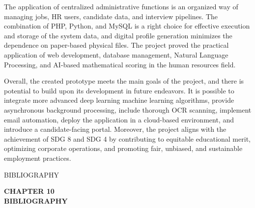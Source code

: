 \documentclass[12pt,a4paper]{report}
\begin{document}
The application of centralized administrative functions is an organized
way of managing jobs, HR users, candidate data, and interview pipelines.
The combination of PHP, Python, and MySQL is a right choice for effective
execution and storage of the system data, and digital profile generation
minimizes the dependence on paper-based physical files. The project proved the
practical application of web development, database management, Natural Language Processing,
and AI-based mathematical scoring in the human resources field.

Overall, the created prototype meets the main goals of the project, and there is
potential to build upon its development in future endeavors. It is possible
to integrate more advanced deep learning machine learning algorithms, provide asynchronous background processing, include thorough OCR scanning, implement email automation, deploy the application in a cloud-based
environment, and introduce a candidate-facing portal. Moreover, the project aligns with
the achievement of SDG 8 and SDG 4 by contributing to equitable
educational merit, optimizing corporate operations, and promoting fair, unbiased, and sustainable employment practices.

\clearpage


{\protect\numberline{\thechapter}BIBLIOGRAPHY}

\thispagestyle{empty}

\vspace*{\fill}

\begin{center}
    {\fontsize{14pt}{17pt}\selectfont\textbf{CHAPTER 10}}\\[1cm]
    {\fontsize{14pt}{17pt}\selectfont\textbf{BIBLIOGRAPHY}}
\end{center}

\vspace*{\fill}

\clearpage
\end{document}
